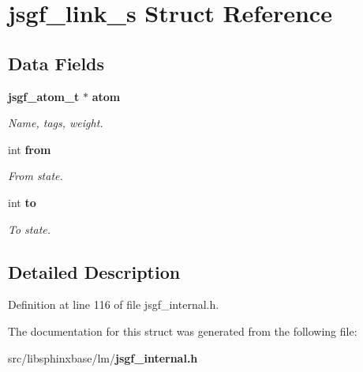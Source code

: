 \section{jsgf\+\_\+link\+\_\+s Struct Reference}
\label{structjsgf__link__s}
\subsection*{Data Fields}
\begin{DoxyCompactItemize}
\item 
{\bf jsgf\+\_\+atom\+\_\+t} $\ast$ {\bf atom}\label{structjsgf__link__s_a140a7cfbe76100928b9c7ea052435ca5}

\begin{DoxyCompactList}\small\item\em Name, tags, weight. \end{DoxyCompactList}\item 
int {\bf from}\label{structjsgf__link__s_a02f9b2bc3b98e802164e80d051923bb3}

\begin{DoxyCompactList}\small\item\em From state. \end{DoxyCompactList}\item 
int {\bf to}\label{structjsgf__link__s_a9da8ad9d87149f0cfca6ca815c581717}

\begin{DoxyCompactList}\small\item\em To state. \end{DoxyCompactList}\end{DoxyCompactItemize}


\subsection{Detailed Description}


Definition at line 116 of file jsgf\+\_\+internal.\+h.



The documentation for this struct was generated from the following file\+:\begin{DoxyCompactItemize}
\item 
src/libsphinxbase/lm/{\bf jsgf\+\_\+internal.\+h}\end{DoxyCompactItemize}
